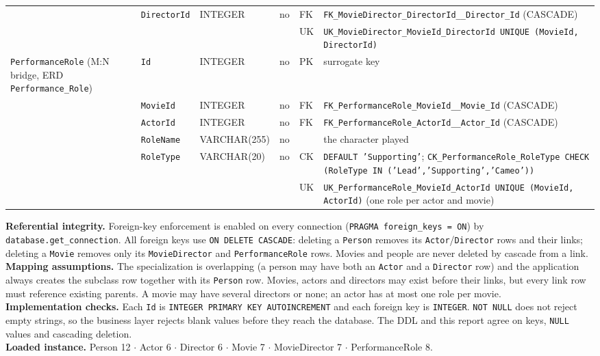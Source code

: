 \documentclass[sigconf,nonacm]{acmart}
\newcommand{\tn}[1]{\texttt{#1}}
\begin{document}
\begin{table}[p]
\begin{tabular}{@{}p{1.0in}p{.8in}p{.9in}p{.35in}p{.45in}>{\raggedright\arraybackslash}p{3.0in}@{}}
 & \tn{DirectorId} & INTEGER & no & FK & \tn{FK\_\allowbreak MovieDirector\_\allowbreak DirectorId\_\allowbreak 2\_\allowbreak Director\_\allowbreak Id} (CASCADE)\\
 & & & & UK & \tn{UK\_\allowbreak MovieDirector\_\allowbreak MovieId\_\allowbreak DirectorId UNIQUE (MovieId, DirectorId)}\\\midrule
\tn{PerformanceRole} (M:N bridge, ERD \tn{Performance\_\allowbreak Role}) & \tn{Id} & INTEGER & no & PK & surrogate key\\
 & \tn{MovieId} & INTEGER & no & FK & \tn{FK\_\allowbreak PerformanceRole\_\allowbreak MovieId\_\allowbreak 2\_\allowbreak Movie\_\allowbreak Id} (CASCADE)\\
 & \tn{ActorId} & INTEGER & no & FK & \tn{FK\_\allowbreak PerformanceRole\_\allowbreak ActorId\_\allowbreak 2\_\allowbreak Actor\_\allowbreak Id} (CASCADE)\\
 & \tn{RoleName} & VARCHAR(255) & no & & the character played\\
 & \tn{RoleType} & VARCHAR(20) & no & CK & \tn{DEFAULT 'Supporting'}; \tn{CK\_\allowbreak PerformanceRole\_\allowbreak RoleType CHECK (RoleType IN ('Lead','Supporting','Cameo'))}\\
 & & & & UK & \tn{UK\_\allowbreak PerformanceRole\_\allowbreak MovieId\_\allowbreak ActorId UNIQUE (MovieId, ActorId)} (one role per actor and movie)\\\bottomrule
\end{tabular}

\medskip\raggedright
\textbf{Referential integrity.} Foreign-key enforcement is enabled on every connection (\tn{PRAGMA foreign\_keys = ON}) by \tn{database.get\_connection}.
All foreign keys use \tn{ON DELETE CASCADE}: deleting a \tn{Person} removes its \tn{Actor}/\tn{Director} rows and their links; deleting a
\tn{Movie} removes only its \tn{MovieDirector} and \tn{PerformanceRole} rows. Movies and people are never deleted by cascade from a link.\\
\textbf{Mapping assumptions.} The specialization is overlapping (a person may have both an \tn{Actor} and a \tn{Director} row) and the
application always creates the subclass row together with its \tn{Person} row. Movies, actors and directors may exist before their
links, but every link row must reference existing parents. A movie may have several directors or none; an actor has at most one role per movie.\\
\textbf{Implementation checks.} Each \tn{Id} is \tn{INTEGER PRIMARY KEY AUTOINCREMENT} and each foreign key is \tn{INTEGER}. \tn{NOT NULL} does not reject
empty strings, so the business layer rejects blank values before they reach the database. The DDL and this report agree on keys, \tn{NULL} values and cascading deletion.\\
\textbf{Loaded instance.} Person 12 $\cdot$ Actor 6 $\cdot$ Director 6 $\cdot$ Movie 7 $\cdot$ MovieDirector 7 $\cdot$ PerformanceRole 8.
\end{table}
\end{document}
